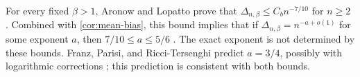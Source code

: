 \begin{remark}\label{rem:bias-exponent}
For every fixed $\beta>1$, Aronow and Lopatto prove that $\Delta_{n,\beta}\le C_b n^{-7/10}$ for $n\ge2$ \cite[Theorem~1.1]{hexagon-bias}. Combined with \cref{cor:mean-bias}, this bound implies that if $\Delta_{n,\beta}=n^{-a+o(1)}$ for some exponent $a$, then $7/10\le a\le5/6$ \cite[Section~1.6, p.~11]{hexagon-bias}. The exact exponent is not determined by these bounds. Franz, Parisi, and Ricci-Tersenghi predict $a=3/4$, possibly with logarithmic corrections \cite[(13)--(17)]{franz-parisi-ricci-2026}; this prediction is consistent with both bounds.
\end{remark}

